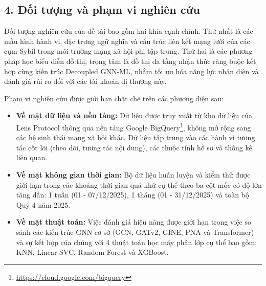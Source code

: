 \subsection{4. Đối tượng và phạm vi nghiên cứu}

\indent\indent Đối tượng nghiên cứu của đề tài bao gồm hai khía cạnh chính. Thứ nhất là các mẫu hình hành vi, đặc trưng ngữ nghĩa và cấu trúc liên kết mạng lưới của các cụm Sybil trong môi trường mạng xã hội phi tập trung. Thứ hai là các phương pháp học biểu diễn đồ thị, trọng tâm là đồ thị đa tầng nhận thức ràng buộc kết hợp cùng kiến trúc Decoupled GNN-ML, nhằm tối ưu hóa năng lực nhận diện và đánh giá rủi ro đối với các tài khoản dị thường này.\vspace{0.3cm}

Phạm vi nghiên cứu được giới hạn chặt chẽ trên các phương diện sau:
\begin{itemize}[label={--}, itemsep=1pt]
    \item \textbf{Về mặt dữ liệu và nền tảng:} Dữ liệu được truy xuất từ kho dữ liệu của Lens Protocol thông qua nền tảng Google BigQuery\footnote{\url{https://cloud.google.com/bigquery}}, không mở rộng sang các hệ sinh thái mạng xã hội khác. Dữ liệu tập trung vào các hành vi tương tác cốt lõi (theo dõi, tương tác nội dung), các thuộc tính hồ sơ và thống kê liên quan.
    \item \textbf{Về mặt không gian thời gian:} Bộ dữ liệu huấn luyện và kiểm thử được giới hạn trong các khoảng thời gian quá khứ cụ thể theo ba cột mốc có độ lớn tăng dần: 1 tuần (01 - 07/12/2025), 1 tháng (01 - 31/12/2025) và toàn bộ Quý 4 năm 2025.
    \item \textbf{Về mặt thuật toán:} Việc đánh giá hiệu năng được giới hạn trong việc so sánh các kiến trúc GNN cơ sở (GCN, GATv2, GINE, PNA và Transformer) và sự kết hợp của chúng với 4 thuật toán học máy phân lớp cụ thể bao gồm: KNN, Linear SVC, Random Forest và XGBoost.
\end{itemize}